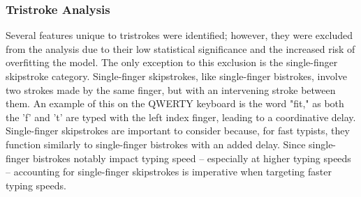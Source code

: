\subsubsection{Tristroke Analysis}
\noindent Several features unique to tristrokes were identified; however, they were excluded from the analysis due to their low statistical significance  and the increased risk of overfitting the model. The only exception to this exclusion is the single-finger skipstroke category. Single-finger skipstrokes, like single-finger bistrokes, involve two strokes made by the same finger, but with an intervening stroke between them. An example of this on the QWERTY keyboard is the word "fit," as both the 'f' and 't' are typed with the left index finger, leading to a coordinative delay. Single-finger skipstrokes are important to consider because, for fast typists, they function similarly to single-finger bistrokes with an added delay. Since single-finger bistrokes notably impact typing speed -- especially at higher typing speeds -- accounting for single-finger skipstrokes is imperative when targeting faster typing speeds.



